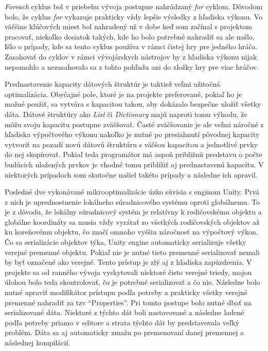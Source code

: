 \documentclass[slovak, bachelorpractice]{diploma}
\begin{document}
\textit{Foreach} cyklus bol v priebehu vývoja postupne nahrádzaný \textit{for} cyklom. Dôvodom bolo, že cyklus \textit{for} vykazuje prakticky vždy lepšie výsledky z hľadiska výkonu. Vo väčšine kľúčových miest bol nahradený už v dobe keď som začínal s projektom pracovať, niekoľko desiatok takých, kde ho bolo potrebné nahradiť sa ale našlo. Išlo o prípady, kde sa tento cyklus používa v rámci čistej hry pre jedného hráča. Zasahovať do cyklov v rámci vývojárskych nástrojov by z hľadiska výkonu nijak nepomohlo a nezasahovalo sa z tohto pohľadu ani do zložky hry pre viac hráčov.

Prednastavenie kapacity dátových štruktúr je taktiež veľmi užitočná optimalizácia. Obyčajné pole, ktoré je na projekte preferované, pokiaľ ho je možné použiť, sa vytvára s kapacitou takou, aby dokázalo bezpečne uložiť všetky dáta. Dátové štruktúry ako \textit{List} či \textit{Dictionary} majú naproti tomu výhodu, že môžu svoju kapacitu postupne zväčšovať. Časté zväčšovanie je ale veľmi náročné z hľadiska výpočtového výkonu nakoľko je nutné po presiahnutí pôvodnej kapacity vytvoriť na pozadí novú dátovú štruktúru s väčšou kapacitou a jednotlivé prvky do nej skopírovať. Pokiaľ teda programátor má aspoň približnú predstavu o počte budúcich uložených prvkov je vhodné tomu priblížiť aj prednastavenú kapacitu. V niektorých prípadoch som skutočne našiel takéto prípady a následne ich opravil.

Posledné dve vykonávané mikrooptimalizácie úzko súvisia s enginom Unity. Prvá z nich je uprednostnenie lokálneho súradnicového systému oproti globálnemu. To je z dôvodu, že lokálny súradnicový systém je relatívny k rodičovskému objektu a globálne koordináty sa musia vždy vyrátať zo všetkých rodičovských objektov až ku koreňovému objektu, čo značí omnoho vyššiu náročnosť na výpočtový výkon. Čo sa serializácie objektov týka, Unity engine automaticky serializuje všetky verejné premenné objektu. Pokiaľ nie je nutné tieto premenné serializovať nemali by byť označené ako verejné. Tento prístup je zlý aj z hľadiska zapúzdrenia. V projekte sa od ranného vývoja vyskytovali niektoré čisto verejné triedy, mojou úlohou bolo teda skontrolovať, čo je potrebné serializovať a čo nie. Následne bolo nutné upraviť modifikátor prístupu podľa potreby a prakticky všetky verejné premenné nahradiť za tzv \enquote{Properties}. Pri tomto postupe bolo nutné dbať na serializované dáta. Niektoré z týchto dát boli nastavované a následne ladené podľa potreby priamo v editore a strata týchto dát by predstavovala veľký problém. Dáta sa aj automaticky zmažu po premenovaní danej premennej a následnej kompilácií. 
\end{document}
